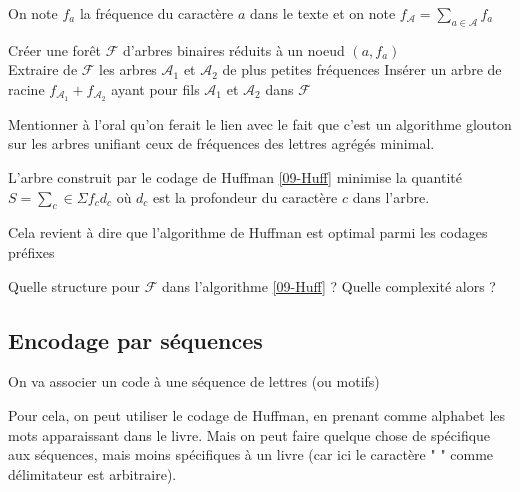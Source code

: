 \begin{algo}
	\label{09-Huff}
	\normalfont On note $f_a$ la fréquence du caractère $a$ dans le texte et on note $f_{\mathcal A} = \sum\limits_{a \in \mathcal A} f_a$\\
	\begin{algorithm}[H]
		Créer une forêt $\mathcal F$ d'arbres binaires réduits à un noeud $(a, f_a)$\\
		{
			Extraire de $\mathcal F$ les arbres $\mathcal A_1$ et $\mathcal A_2$ de plus petites fréquences 
			Insérer un arbre de racine $f_{\mathcal A_1} + f_{\mathcal A_2}$ ayant pour fils $\mathcal A_1$ et $\mathcal A_2$ dans $\mathcal F$
		}
	\end{algorithm}
\end{algo}

\begin{com}
	Mentionner à l'oral qu'on ferait le lien avec le fait que c'est un algorithme glouton sur les arbres unifiant ceux de fréquences des lettres agrégés minimal.
\end{com}

\begin{theorem}
	L'arbre construit par le codage de Huffman \ref{09-Huff} minimise la quantité $S = \sum\limits_c\in \Sigma f_c d_c$ où $d_c$ est la profondeur du caractère $c$ dans l'arbre. 
\end{theorem}

\begin{idee}
	Cela revient à dire que l'algorithme de Huffman est optimal parmi les codages préfixes
\end{idee}

\begin{exercise}
	Quelle structure pour $\mathcal F$ dans l'algorithme \ref{09-Huff} ? Quelle complexité alors ?
\end{exercise}

\subsection{Encodage par séquences}

\begin{idee}
	On va associer un code à une séquence de lettres (ou motifs)
\end{idee}

\begin{rem}
	Pour cela, on peut utiliser le codage de Huffman, en prenant comme alphabet les mots apparaissant dans le livre. Mais on peut faire quelque chose de spécifique aux séquences, mais moins spécifiques à un livre (car ici le caractère " " comme délimitateur est arbitraire).
\end{rem}

